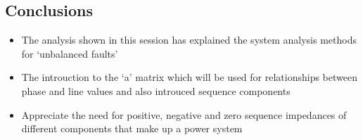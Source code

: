 \subsection{Conclusions}
\begin{itemize}
	\item The analysis shown in this session has explained the system analysis methods for `unbalanced faults'
	\item The introuction to the `a' matrix which will be used for relationships between phase and line values and also introuced sequence components
	\item Appreciate the need for positive, negative and zero sequence impedances of different components that make up a power system
\end{itemize}













